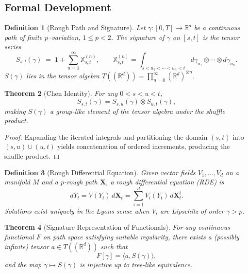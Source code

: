\documentclass[12pt,a4paper,twoside,openright]{book}
\newtheorem{theorem}{Theorem}
\newtheorem{definition}[theorem]{Definition}
\begin{document}
\subsection*{Formal Development}

\begin{definition}[Rough Path and Signature]
Let $\gamma:[0,T]\!\to\!\mathbb{R}^d$ be a continuous path of finite $p$–variation, $1\!\le\! p\!<\!2$.  
The \emph{signature} of $\gamma$ on $[s,t]$ is the tensor series
\begin{equation}
S_{s,t}(\gamma)
 \;=\;
 1
 + \sum_{n=1}^\infty
   \mathbb{X}^{(n)}_{s,t},
 \qquad
 \mathbb{X}^{(n)}_{s,t}
   = \int_{s<u_1<\cdots<u_n<t}
       d\gamma_{u_1}\otimes\!\cdots\!\otimes d\gamma_{u_n}.
\end{equation}
$S(\gamma)$ lies in the tensor algebra
$T((\mathbb{R}^d)) = \prod_{n=0}^\infty (\mathbb{R}^d)^{\otimes n}$.
\end{definition}

\begin{theorem}[Chen Identity]
\label{thm:chen}
For any $0<s<u<t$,
\[
S_{s,t}(\gamma)
 = S_{s,u}(\gamma)\otimes S_{u,t}(\gamma),
\]
making $S(\gamma)$ a group-like element of the tensor algebra under the shuffle product.
\end{theorem}

\begin{proof}
Expanding the iterated integrals and partitioning the domain $(s,t)$ into $(s,u)\cup(u,t)$ yields concatenation of ordered increments, producing the shuffle product.
\end{proof}

\begin{definition}[Rough Differential Equation]
Given vector fields $V_1,\ldots,V_d$ on a manifold $M$ and a $p$-rough path $\mathbf{X}$,  
a \emph{rough differential equation} (RDE) is
\begin{equation}
dY_t = V(Y_t)\,d\mathbf{X}_t
   = \sum_{i=1}^d V_i(Y_t)\,d\mathbf{X}_t^i.
\end{equation}
Solutions exist uniquely in the Lyons sense when $V_i$ are Lipschitz of order $\gamma>p$.
\end{definition}

\begin{theorem}[Signature Representation of Functionals]
\label{thm:lyons}
For any continuous functional $F$ on path space satisfying suitable regularity,
there exists a (possibly infinite) tensor $a\in T((\mathbb{R}^d))$ such that
\[
F[\gamma] = \langle a, S(\gamma)\rangle,
\]
and the map $\gamma\mapsto S(\gamma)$ is injective up to tree-like equivalence.
\end{theorem}
\end{document}
